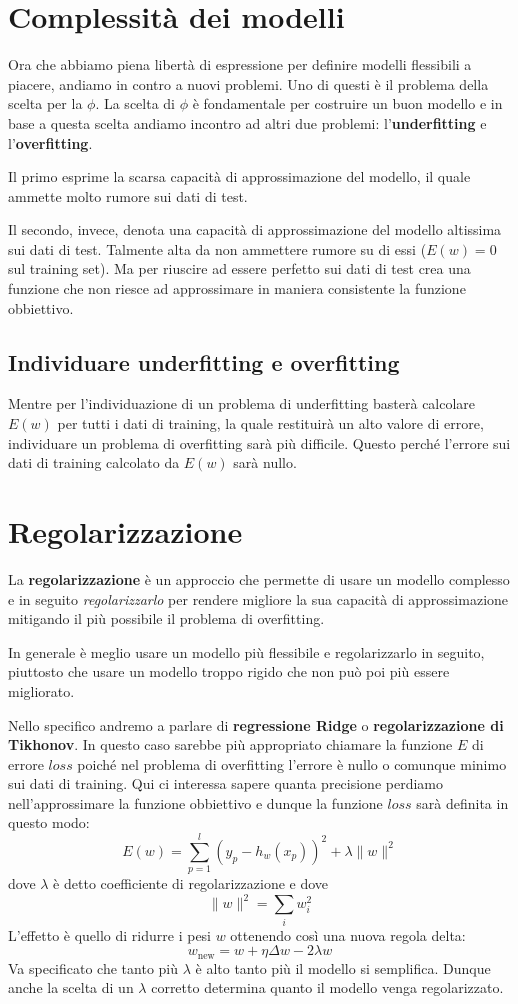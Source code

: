 \section{Complessit\`a dei modelli}
Ora che abbiamo piena libert\`a di espressione per definire modelli flessibili a piacere, andiamo in contro a nuovi
problemi. Uno di questi \`e il problema della scelta per la $\phi$. La scelta di $\phi$ \`e fondamentale per costruire
un buon modello e in base a questa scelta andiamo incontro ad altri due problemi: l'\textbf{underfitting} e
l'\textbf{overfitting}.

Il primo esprime la scarsa capacit\`a di approssimazione del modello, il quale ammette molto rumore sui dati di test.

Il secondo, invece, denota una capacit\`a di approssimazione del modello altissima sui dati di test. Talmente alta da
non ammettere rumore su di essi ($E(w) = 0$ sul training set). Ma per riuscire ad essere perfetto sui dati di test crea
una funzione che non riesce ad approssimare in maniera consistente la funzione obbiettivo.

\subsection*{Individuare underfitting e overfitting}
Mentre per l'individuazione di un problema di underfitting baster\`a calcolare $E(w)$ per tutti i dati di training,
la quale restituir\`a un alto valore di errore, individuare un problema di overfitting sar\`a pi\`u difficile.
Questo perch\'e l'errore sui dati di training calcolato da $E(w)$ sar\`a nullo.

\section{Regolarizzazione}
La \textbf{regolarizzazione} \`e un approccio che permette di usare un modello complesso e in seguito
\emph{regolarizzarlo} per rendere migliore la sua capacit\`a di approssimazione mitigando il pi\`u possibile il
problema di overfitting.

In generale \`e meglio usare un modello pi\`u flessibile e regolarizzarlo in seguito, piuttosto che usare un modello
troppo rigido che non pu\`o poi pi\`u essere migliorato.

Nello specifico andremo a parlare di \textbf{regressione Ridge} o \textbf{regolarizzazione di Tikhonov}. In questo caso
sarebbe pi\`u appropriato chiamare la funzione $E$ di errore $loss$ poich\'e nel problema di overfitting l'errore \`e
nullo o comunque minimo sui dati di training. Qui ci interessa sapere quanta precisione perdiamo nell'approssimare la
funzione obbiettivo e dunque la funzione $loss$ sar\`a definita in questo modo:
\[ E(w) = \sum_{p = 1}^l (y_p - h_w(x_p))^2 + \lambda \| w \|^2 \]
dove $\lambda$ \`e detto coefficiente di regolarizzazione e dove
\[ \| w \|^2 = \sum_{i} w_i^2 \]
L'effetto \`e quello di ridurre i pesi $w$ ottenendo cos\`i una nuova regola delta:
\[ w_{\text{new}} = w + \eta \Delta w - 2 \lambda w \]
Va specificato che tanto pi\`u $\lambda$ \`e alto tanto pi\`u il modello si semplifica. Dunque anche la scelta di un
$\lambda$ corretto determina quanto il modello venga regolarizzato.

